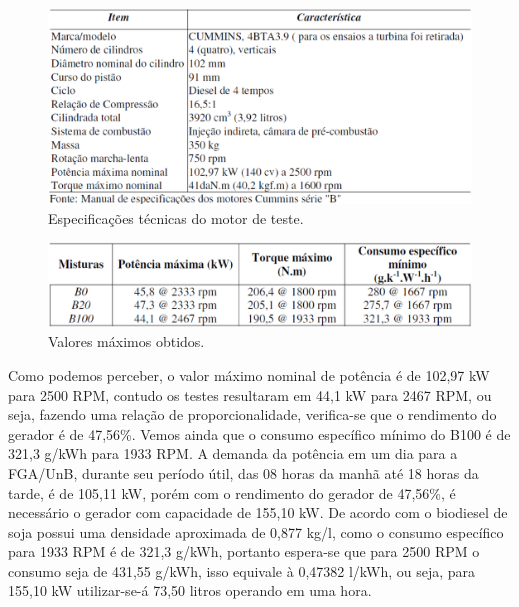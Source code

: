 \begin{figure}[!h]
  \centering
  \includegraphics[keepaspectratio=true,scale=0.5]{figuras/tabela_motor.eps}
  \caption{Especificações técnicas do motor de teste.}
  \label{fig:tabela_motor}
\end{figure}

\begin{figure}[!h]
  \centering
  \includegraphics[keepaspectratio=true,scale=0.5]{figuras/tabela_resultados.eps}
  \caption{Valores máximos obtidos.}
  \label{fig:tabela_resultados}
\end{figure}

Como podemos perceber, o valor máximo nominal de potência é de 102,97 kW para 2500 RPM, contudo os testes resultaram em 44,1 kW para 2467 RPM, ou seja, fazendo uma relação de proporcionalidade, verifica-se que o rendimento do gerador é de 47,56\%.
Vemos ainda que o consumo específico mínimo do B100 é de 321,3 g/kWh para 1933 RPM.
A demanda da potência em um dia para a FGA/UnB, durante seu período útil, das 08 horas da manhã até 18 horas da tarde, é de 105,11 kW, porém com o rendimento do gerador de 47,56\%, é necessário o gerador com capacidade de 155,10 kW.
De acordo com \cite{regina} o biodiesel de soja possui uma densidade aproximada de 0,877 kg/l, como o consumo específico para 1933 RPM é de 321,3 g/kWh, portanto espera-se que para 2500 RPM o consumo seja de 431,55 g/kWh, isso equivale à 0,47382 l/kWh, ou seja, para 155,10 kW utilizar-se-á 73,50 litros operando em uma hora.








